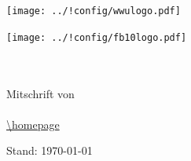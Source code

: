 \begin{titlepage}
\pagestyle{empty}
\begin{center}
\begin{minipage}{0.4\textwidth}
\begin{flushleft}
\texttt{[image: ../!config/wwulogo.pdf]}
\end{flushleft}
\end{minipage}
\hfill
\begin{minipage}{0.4\textwidth}
\begin{flushright}
\vspace*{0.3cm}
\texttt{[image: ../!config/fb10logo.pdf]} \
\end{flushright}
\end{minipage}

\vspace*{6cm}
\textbf{\Huge{\fach}} \\
\vspace{0.2cm} 
\textbf{{\LARGE \untertitel}} \\
\vspace{0.6cm}
\LARGE{Mitschrift von \verfasser} \\
\vspace{0.6cm}
\LARGE{\semester} \\
\vspace*{2cm}
\footnotesize{\url{\homepage}}
\vfill

\vspace*{2cm}
\begin{flushright}
{\footnotesize Stand: \today}
\end{flushright}
\end{center}
\end{titlepage}
